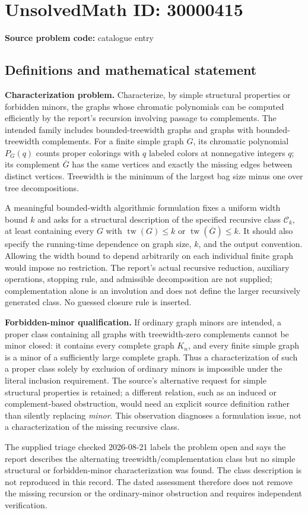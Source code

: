 \documentclass[11pt]{article}
\begin{document}
\section*{UnsolvedMath ID: 30000415}
\textbf{Source problem code:} catalogue entry
\subsection{Definitions and mathematical statement}
\textbf{Characterization problem.} Characterize, by simple structural properties or forbidden minors, the graphs whose chromatic polynomials can be computed efficiently by the report's recursion involving passage to complements. The intended family includes bounded-treewidth graphs and graphs with bounded-treewidth complements. For a finite simple graph \(G\), its chromatic polynomial \(P_G(q)\) counts proper colorings with \(q\) labeled colors at nonnegative integers \(q\); its complement \(\overline G\) has the same vertices and exactly the missing edges between distinct vertices. Treewidth is the minimum of the largest bag size minus one over tree decompositions.\par A meaningful bounded-width algorithmic formulation fixes a uniform width bound \(k\) and asks for a structural description of the specified recursive class \(\mathcal C_k\), at least containing every \(G\) with \(\operatorname{tw}(G)\le k\) or \(\operatorname{tw}(\overline G)\le k\). It should also specify the running-time dependence on graph size, \(k\), and the output convention. Allowing the width bound to depend arbitrarily on each individual finite graph would impose no restriction. The report's actual recursive reduction, auxiliary operations, stopping rule, and admissible decomposition are not supplied; complementation alone is an involution and does not define the larger recursively generated class. No guessed closure rule is inserted.\par \textbf{Forbidden-minor qualification.} If ordinary graph minors are intended, a proper class containing all graphs with treewidth-zero complements cannot be minor closed: it contains every complete graph \(K_n\), and every finite simple graph is a minor of a sufficiently large complete graph. Thus a characterization of such a proper class solely by exclusion of ordinary minors is impossible under the literal inclusion requirement. The source's alternative request for simple structural properties is retained; a different relation, such as an induced or complement-based obstruction, would need an explicit source definition rather than silently replacing \emph{minor}. This observation diagnoses a formulation issue, not a characterization of the missing recursive class.\par The supplied triage checked 2026-08-21 labels the problem open and says the report describes the alternating treewidth/complementation class but no simple structural or forbidden-minor characterization was found. The class description is not reproduced in this record. The dated assessment therefore does not remove the missing recursion or the ordinary-minor obstruction and requires independent verification.
\end{document}
